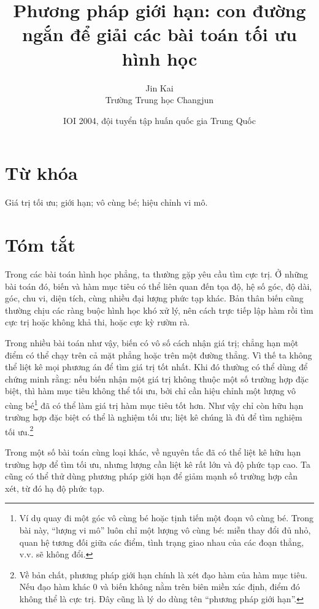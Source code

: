 \documentclass[11pt]{article}
\title{Phương pháp giới hạn: con đường ngắn để giải các bài toán tối ưu hình học}
\author{Jin Kai\\Trường Trung học Changjun}
\date{IOI 2004, đội tuyển tập huấn quốc gia Trung Quốc}
\begin{document}
\maketitle


\section*{Từ khóa}

Giá trị tối ưu; giới hạn; vô cùng bé; hiệu chỉnh vi mô.

\section*{Tóm tắt}

Trong các bài toán hình học phẳng, ta thường gặp yêu cầu tìm cực trị. Ở những
bài toán đó, biến và hàm mục tiêu có thể liên quan đến tọa độ, hệ số góc, độ
dài, góc, chu vi, diện tích, cùng nhiều đại lượng phức tạp khác. Bản thân biến
cũng thường chịu các ràng buộc hình học khó xử lý, nên cách trực tiếp lập hàm
rồi tìm cực trị hoặc không khả thi, hoặc cực kỳ rườm rà.

Trong nhiều bài toán như vậy, biến có vô số cách nhận giá trị; chẳng hạn một
điểm có thể chạy trên cả mặt phẳng hoặc trên một đường thẳng. Vì thế ta không
thể liệt kê mọi phương án để tìm giá trị tốt nhất. Khi đó thường có thể dùng
 để chứng minh rằng: nếu biến nhận một giá trị không
thuộc một số trường hợp đặc biệt, thì hàm mục tiêu không thể tối ưu, bởi chỉ
cần hiệu chỉnh một lượng vô cùng bé\footnote{Ví dụ quay đi một góc vô cùng bé
hoặc tịnh tiến một đoạn vô cùng bé. Trong bài này, ``lượng vi mô'' luôn chỉ
một lượng vô cùng bé: miễn thay đổi đủ nhỏ, quan hệ tương đối giữa các điểm,
tình trạng giao nhau của các đoạn thẳng, v.v. sẽ không đổi.} đã có thể làm
giá trị hàm mục tiêu tốt hơn. Như vậy chỉ còn hữu hạn trường hợp đặc biệt có
thể là nghiệm tối ưu; liệt kê chúng là đủ để tìm nghiệm tối ưu.\footnote{Về
bản chất, phương pháp giới hạn chính là xét đạo hàm của hàm mục tiêu. Nếu đạo
hàm khác \(0\) và biến không nằm trên biên miền xác định, điểm đó không thể là
cực trị. Đây cũng là lý do dùng tên ``phương pháp giới hạn''.}

Trong một số bài toán cùng loại khác, về nguyên tắc đã có thể liệt kê hữu hạn
trường hợp để tìm tối ưu, nhưng lượng cần liệt kê rất lớn và độ phức tạp cao.
Ta cũng có thể thử dùng phương pháp giới hạn để giảm mạnh số trường hợp cần
xét, từ đó hạ độ phức tạp.
\end{document}
